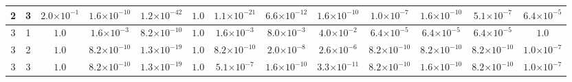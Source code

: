 \begin{landscape}
\begin{table}[H]
{\begin{tabular}{ccccccccccccc}
\hline
2 & 3 & $2.0{\scriptstyle\times 10^{-1}}$ & $1.6{\scriptstyle\times 10^{-10}}$ & \textbf{$1.2{\scriptstyle\times 10^{-42}}$} & $1.0$ & $1.1{\scriptstyle\times 10^{-21}}$ & $6.6{\scriptstyle\times 10^{-12}}$ & $1.6{\scriptstyle\times 10^{-10}}$ & $1.0{\scriptstyle\times 10^{-7}}$ & $1.6{\scriptstyle\times 10^{-10}}$ & $5.1{\scriptstyle\times 10^{-7}}$ & $6.4{\scriptstyle\times 10^{-5}}$ \\
\hline
3 & 1 & $1.0$ & $1.6{\scriptstyle\times 10^{-3}}$ & \textbf{$8.2{\scriptstyle\times 10^{-10}}$} & $1.0$ & $1.6{\scriptstyle\times 10^{-3}}$ & $8.0{\scriptstyle\times 10^{-3}}$ & $4.0{\scriptstyle\times 10^{-2}}$ & $6.4{\scriptstyle\times 10^{-5}}$ & $6.4{\scriptstyle\times 10^{-5}}$ & $6.4{\scriptstyle\times 10^{-5}}$ & $1.0$ \\
\hline
3 & 2 & $1.0$ & $8.2{\scriptstyle\times 10^{-10}}$ & \textbf{$1.3{\scriptstyle\times 10^{-19}}$} & $1.0$ & $8.2{\scriptstyle\times 10^{-10}}$ & $2.0{\scriptstyle\times 10^{-8}}$ & $2.6{\scriptstyle\times 10^{-6}}$ & $8.2{\scriptstyle\times 10^{-10}}$ & $8.2{\scriptstyle\times 10^{-10}}$ & $8.2{\scriptstyle\times 10^{-10}}$ & $1.0{\scriptstyle\times 10^{-7}}$ \\
\hline
3 & 3 & $1.0$ & $8.2{\scriptstyle\times 10^{-10}}$ & \textbf{$1.3{\scriptstyle\times 10^{-19}}$} & $1.0$ & $5.1{\scriptstyle\times 10^{-7}}$ & $1.6{\scriptstyle\times 10^{-10}}$ & $3.3{\scriptstyle\times 10^{-11}}$ & $8.2{\scriptstyle\times 10^{-10}}$ & $1.6{\scriptstyle\times 10^{-10}}$ & $8.2{\scriptstyle\times 10^{-10}}$ & $1.0{\scriptstyle\times 10^{-7}}$ \\
\bottomrule
\end{tabular}
}%
\end{table}
\end{landscape}



